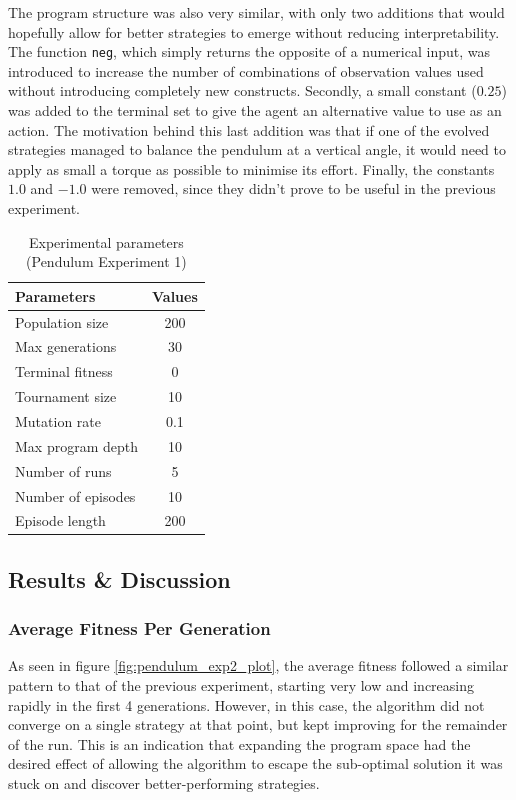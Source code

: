 The program structure was also very similar, with only two additions that would hopefully allow for better strategies to emerge without reducing interpretability. The function \verb+neg+, which simply returns the opposite of a numerical input, was introduced to increase the number of combinations of observation values used without introducing completely new constructs. Secondly, a small constant ($0.25$) was added to the terminal set to give the agent an alternative value to use as an action. The motivation behind this last addition was that if one of the evolved strategies managed to balance the pendulum at a vertical angle, it would need to apply as small a torque as possible to minimise its effort. Finally, the constants $1.0$ and $-1.0$ were removed, since they didn't prove to be useful in the previous experiment.

\begin{table}[ht]
    \centering
    \begin{tabular}{|l|c|}
        \hline
        \textbf{Parameters} & \textbf{Values} \\
        \hline
        Population size     & 200  \\
        Max generations     & 30   \\
        Terminal fitness & 0 \\
        Tournament size     & 10   \\
        Mutation rate       & 0.1  \\
        Max program depth   & 10    \\
        Number of runs      & 5   \\
        Number of episodes  & 10   \\
        Episode length      & 200  \\
        \hline
    \end{tabular}
    \caption{Experimental parameters (Pendulum Experiment 1)}
    \label{tab:pendulum_exp2_params}
\end{table}

\subsection{Results \& Discussion}
\subsubsection{Average Fitness Per Generation}
As seen in figure \ref{fig:pendulum_exp2_plot}, the average fitness followed a similar pattern to that of the previous experiment, starting very low and increasing rapidly in the first 4 generations. However, in this case, the algorithm did not converge on a single strategy at that point, but kept improving for the remainder of the run. This is an indication that expanding the program space had the desired effect of allowing the algorithm to escape the sub-optimal solution it was stuck on and discover better-performing strategies.

